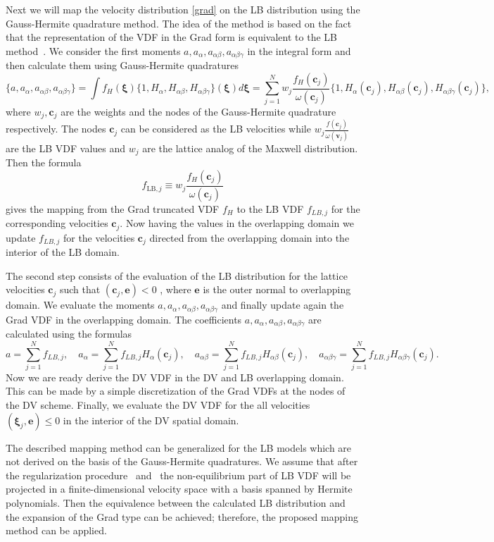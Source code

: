 \documentclass[]{elsarticle} %
\newcommand{\bxi}{\boldsymbol{\xi}}
\newcommand{\bv}{\boldsymbol{v}}
\newcommand{\bc}{\boldsymbol{c}}
\begin{document}
{Next we will map the velocity distribution \eqref{grad} on the LB distribution using the Gauss-Hermite quadrature method.
The idea of the method is based on the fact that the representation of the VDF in the Grad form
is equivalent to the LB method~\cite{He1997, Shan1998, Shan2006}.
We consider the first moments $a,a_{\alpha},a_{\alpha\beta}, a_{\alpha\beta \gamma}$ in the integral form and then calculate them using Gauss-Hermite quadratures
$$
\{ a,a_{\alpha},a_{\alpha\beta}, a_{\alpha\beta \gamma} \}=\int f_H(\bxi)\{1,H_{\alpha}, H_{\alpha\beta} ,H_{\alpha\beta \gamma}\}(\bxi)d\bxi=\sum_{j=1}^N w_j\frac{f_H(\boldsymbol{c}_j)}{\omega(\bc_j)}
\{1,H_{\alpha}(\bc_j),H_{\alpha\beta}(\bc_j), H_{\alpha\beta\gamma}(\bc_j) \},
$$
where $w_j, \boldsymbol{c}_j$ are the weights and the nodes of the Gauss-Hermite quadrature respectively. The nodes $\bc_j$ can be considered as the LB velocities while $ w_j\frac{f(\bc_j)}{\omega(\bv_j)}$ are the LB VDF values and
$w_j$ are the lattice analog of the Maxwell distribution.  Then the formula
\begin{equation}\label{grad_to_latt}
f_{\mathrm{LB},j}\equiv w_j\frac{f_H(\bc_j)}{\omega(\bc_j)}
\end{equation}
gives the mapping from the Grad truncated VDF $f_H$ to the LB VDF $f_{LB,j}$ for the corresponding velocities $\bc_j$. Now having the values in the overlapping domain we update $f_{LB,j}$ for the velocities $\bc_j$ directed from the overlapping domain into the interior of the LB domain.


The second step consists of the evaluation of the LB   distribution for the lattice velocities $\boldsymbol{c}_j$ such that $(\boldsymbol{c}_j,\mathbf{e})<0$ , where $\mathbf{e}$ is the outer normal to overlapping domain.  We evaluate the moments $a,a_{\alpha},a_{\alpha\beta},
a_{\alpha\beta\gamma}$ and finally update again the Grad VDF in the overlapping domain. The coefficients $a,a_{\alpha},a_{\alpha\beta},
a_{\alpha\beta\gamma}$ are calculated using the formulas
$$
a=\sum_{j=1}^N f_{LB,j}, \quad a_{\alpha}=\sum_{j=1}^N f_{LB,j}H_{\alpha}(\bc_j), \quad a_{\alpha\beta}=\sum_{j=1}^N f_{LB,j}H_{\alpha\beta}(\bc_j),
\quad a_{\alpha\beta\gamma}=\sum_{j=1}^N f_{LB,j}H_{\alpha\beta\gamma}(\bc_j).
$$
Now we are ready derive the DV VDF in the DV and LB overlapping domain. This can be made by a simple
discretization of the Grad VDFs at the nodes of the DV scheme. Finally, we evaluate the DV VDF for the all velocities $(\bxi_j,\mathbf{e}) \leq 0$
in the interior of the DV spatial domain.

The described mapping method can be generalized for the LB models which are not derived on the basis of the Gauss-Hermite quadratures.
We assume that after the regularization procedure~\cite{Latt2006, Chen2006} and~\cite{Zhang2006, Mont2015, Mattila2017}
the non-equilibrium part of LB VDF will be projected in a finite-dimensional velocity space with a basis spanned by Hermite polynomials.
Then the equivalence between the calculated LB distribution and
the expansion of the Grad type can be achieved; therefore, the proposed mapping method can be applied.

}
\end{document}
